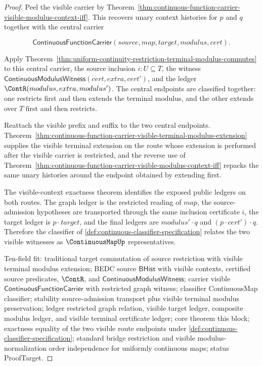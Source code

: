 \begin{proof}
Peel the visible carrier by Theorem~\ref{thm:continuous-function-carrier-visible-modulus-context-iff}. This recovers unary context histories for $p$ and $q$ together with the central carrier

$$
\mathsf{ContinuousFunctionCarrier}(source,map,target,modulus,cert).
$$

Apply Theorem~\ref{thm:uniform-continuity-restriction-terminal-modulus-commutes} to this central carrier, the source inclusion $i:U\subseteq T$, the witness $\mathsf{ContinuousModulusWitness}(cert,extra,cert')$, and the ledger $\ContR(modulus,extra,modulus')$. The central endpoints are classified together: one restricts first and then extends the terminal modulus, and the other extends over $T$ first and then restricts.

Reattach the visible prefix and suffix to the two central endpoints. Theorem~\ref{thm:continuous-function-carrier-visible-terminal-modulus-extension} supplies the visible terminal extension on the route whose extension is performed after the visible carrier is restricted, and the reverse use of Theorem~\ref{thm:continuous-function-carrier-visible-modulus-context-iff} repacks the same unary histories around the endpoint obtained by extending first.

The visible-context exactness theorem identifies the exposed public ledgers on both routes. The graph ledger is the restricted reading of $map$, the source-admission hypotheses are transported through the same inclusion certificate $i$, the target ledger is $p\cdot target$, and the final ledgers are $modulus'\cdot q$ and $(p\cdot cert')\cdot q$. Therefore the classifier of \autoref{def:continuous-classifier-specification} relates the two visible witnesses as $\ContinuousMapUp$ representatives.

Ten-field fit: traditional target commutation of source restriction with visible terminal modulus extension; BEDC source $\mathsf{BHist}$ with visible contexts, certified source predicates, $\ContR$, and $\mathsf{ContinuousModulusWitness}$; carrier visible $\mathsf{ContinuousFunctionCarrier}$ with restricted graph witness; classifier ContinuousMap classifier; stability source-admission transport plus visible terminal modulus preservation; ledger restricted graph relation, visible target ledger, composite modulus ledger, and visible terminal certificate ledger; core theorem this block; exactness equality of the two visible route endpoints under \autoref{def:continuous-classifier-specification}; standard bridge restriction and visible modulus-normalization order independence for uniformly continuous maps; status ProofTarget.
\end{proof}

